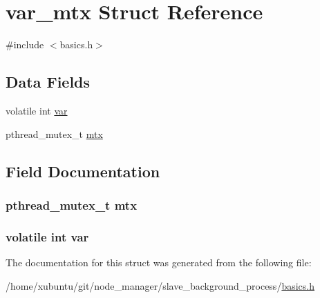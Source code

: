 \hypertarget{structvar__mtx}{}\section{var\+\_\+mtx Struct Reference}
\label{structvar__mtx}


{\ttfamily \#include $<$basics.\+h$>$}

\subsection*{Data Fields}
\begin{DoxyCompactItemize}
\item 
volatile int \hyperlink{structvar__mtx_a92f6e8af8be4f78aa029bec058a833a2}{var}
\item 
pthread\+\_\+mutex\+\_\+t \hyperlink{structvar__mtx_a2680f9fe5653a596c7e779b838180fdc}{mtx}
\end{DoxyCompactItemize}


\subsection{Field Documentation}
\hypertarget{structvar__mtx_a2680f9fe5653a596c7e779b838180fdc}{}
\subsubsection[{mtx}]{\setlength{\rightskip}{0pt plus 5cm}pthread\+\_\+mutex\+\_\+t mtx}\label{structvar__mtx_a2680f9fe5653a596c7e779b838180fdc}
\hypertarget{structvar__mtx_a92f6e8af8be4f78aa029bec058a833a2}{}
\subsubsection[{var}]{\setlength{\rightskip}{0pt plus 5cm}volatile int var}\label{structvar__mtx_a92f6e8af8be4f78aa029bec058a833a2}


The documentation for this struct was generated from the following file\+:\begin{DoxyCompactItemize}
\item 
/home/xubuntu/git/node\+\_\+manager/slave\+\_\+background\+\_\+process/\hyperlink{basics_8h}{basics.\+h}\end{DoxyCompactItemize}
